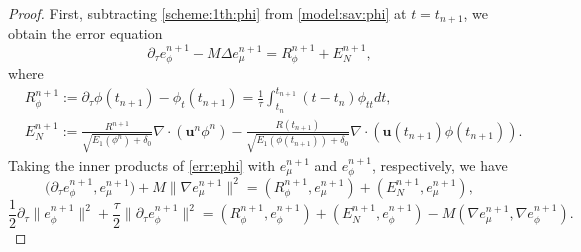 \documentclass[10pt,a4paper]{amsart}
\newcommand{\p}{\partial}
\begin{document}
\begin{proof} First, subtracting \eqref{scheme:1th:phi} from \eqref{model:sav:phi} at $t=t_{n+1}$, we obtain the error equation
	\begin{equation} \label{err:ephi}
		\p_\tau  e_\phi^{n+1}-M \Delta e_\mu^{n+1}=R_\phi^{n+1}+E_N^{n+1},
	\end{equation}
	where  
	\begin{equation*} 
		\begin{aligned}
			& R_\phi^{n+1}:=\p_\tau \phi(t_{n+1})- \phi_t(t_{n+1})=\frac{1}{\tau} \int_{t_n}^{t_{n+1}}(t-t_n) \phi_{tt} d t, \\
			& E_N^{n+1}:=\frac{R^{n+1}}{\sqrt{E_1(\phi^n)+\delta_0}} \nabla \cdot({\bm u}^n \phi^n) -\frac{R(t_{n+1})}{\sqrt{E_1(\phi(t_{n+1}))+\delta_0}}\nabla \cdot  (\bm u(t_{n+1})\phi(t_{n+1})).
		\end{aligned} 
	\end{equation*}
	Taking the inner products of \eqref{err:ephi} with $e_\mu^{n+1}$ and $e_\phi^{n+1}$, respectively, we have
	\begin{equation} \label{err:ephi:1}
		\big(\p_\tau  e_\phi^{n+1}, e_\mu^{n+1}\big)+M\|\nabla e_\mu^{n+1}\|^2= (R_\phi^{n+1}, e_\mu^{n+1})+(E_N^{n+1}, e_\mu^{n+1}),
	\end{equation}
	\begin{equation} \label{err:ephi:2}
		\frac{1}{2}\p_\tau \| e_\phi^{n+1}\|^2+ \frac{\tau}{2}\|\p_\tau  e_\phi^{n+1}\|^2=(R_\phi^{n+1}, e_\phi^{n+1})+(E_N^{n+1}, e_\phi^{n+1})-M(\nabla e_\mu^{n+1}, \nabla e_\phi^{n+1}).
	\end{equation}
	

\end{proof}
\end{document}
